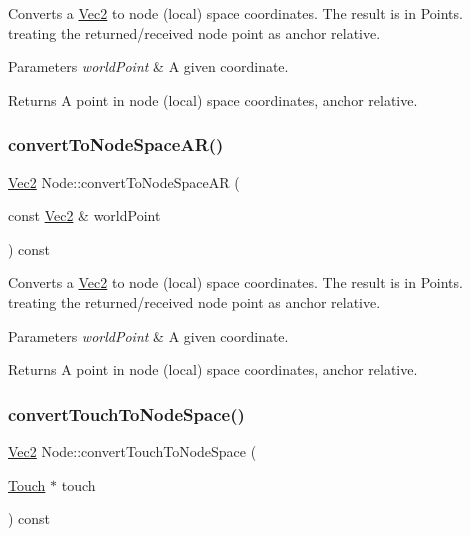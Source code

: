 Converts a \hyperlink{classVec2}{Vec2} to node (local) space coordinates. The result is in Points. treating the returned/received node point as anchor relative.


\begin{DoxyParams}{Parameters}
{\em world\+Point} & A given coordinate. \\
\hline
\end{DoxyParams}
\begin{DoxyReturn}{Returns}
A point in node (local) space coordinates, anchor relative. 
\end{DoxyReturn}
\mbox{\label{classNode_a9c7e573a38882cc0727c5f8f65cd9187}} 
\subsubsection{\texorpdfstring{convert\+To\+Node\+Space\+A\+R()}{convertToNodeSpaceAR()}\hspace{0.1cm}{\footnotesize\ttfamily [2/2]}}
{\footnotesize\ttfamily \hyperlink{classVec2}{Vec2} Node\+::convert\+To\+Node\+Space\+AR (\begin{DoxyParamCaption}\item[{const \hyperlink{classVec2}{Vec2} \&}]{world\+Point }\end{DoxyParamCaption}) const}

Converts a \hyperlink{classVec2}{Vec2} to node (local) space coordinates. The result is in Points. treating the returned/received node point as anchor relative.


\begin{DoxyParams}{Parameters}
{\em world\+Point} & A given coordinate. \\
\hline
\end{DoxyParams}
\begin{DoxyReturn}{Returns}
A point in node (local) space coordinates, anchor relative. 
\end{DoxyReturn}
\mbox{\label{classNode_a6ff92b98917dbaea150b90b578a84fca}} 
\subsubsection{\texorpdfstring{convert\+Touch\+To\+Node\+Space()}{convertTouchToNodeSpace()}\hspace{0.1cm}{\footnotesize\ttfamily [1/2]}}
{\footnotesize\ttfamily \hyperlink{classVec2}{Vec2} Node\+::convert\+Touch\+To\+Node\+Space (\begin{DoxyParamCaption}\item[{\hyperlink{classTouch}{Touch} $\ast$}]{touch }\end{DoxyParamCaption}) const}

